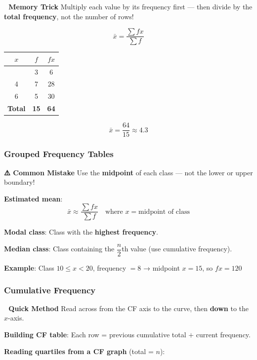 \documentclass[
  letterpaper,
  DIV=11,
  numbers=noendperiod]{scrreprt}
\theoremstyle{definition}
\theoremstyle{remark}
\begin{document}
\textbf{🎯 Memory Trick} Multiply each value by its frequency first ---
then divide by the \textbf{total frequency}, not the number of rows!

\[\bar{x} = \frac{\sum fx}{\sum f}\]

\begin{longtable}[]{@{}ccc@{}}
\toprule\noalign{}
\(x\) & \(f\) & \(fx\) \\
\midrule\noalign{}
\endhead
\bottomrule\noalign{}
\endlastfoot
2 & 3 & 6 \\
4 & 7 & 28 \\
6 & 5 & 30 \\
\textbf{Total} & \textbf{15} & \textbf{64} \\
\end{longtable}

\[\bar{x} = \frac{64}{15} \approx 4.3\]

\subsubsection*{Grouped Frequency
Tables}\label{grouped-frequency-tables}

\textbf{⚠️ Common Mistake} Use the \textbf{midpoint} of each class ---
not the lower or upper boundary!

\textbf{Estimated mean}:
\[\bar{x} \approx \frac{\sum fx}{\sum f} \quad \text{where } x = \text{midpoint of class}\]

\textbf{Modal class}: Class with the \textbf{highest frequency}.

\textbf{Median class}: Class containing the \(\dfrac{n}{2}\)th value
(use cumulative frequency).

\textbf{Example}: Class \(10 \leq x < 20\), frequency \(= 8\) → midpoint
\(x = 15\), so \(fx = 120\)

\subsubsection*{Cumulative Frequency}\label{cumulative-frequency}

\textbf{📝 Quick Method} Read across from the CF axis to the curve, then
\textbf{down} to the \(x\)-axis.

\textbf{Building CF table}: Each row = previous cumulative total \(+\)
current frequency.

\textbf{Reading quartiles from a CF graph} (total = \(n\)):
\end{document}
